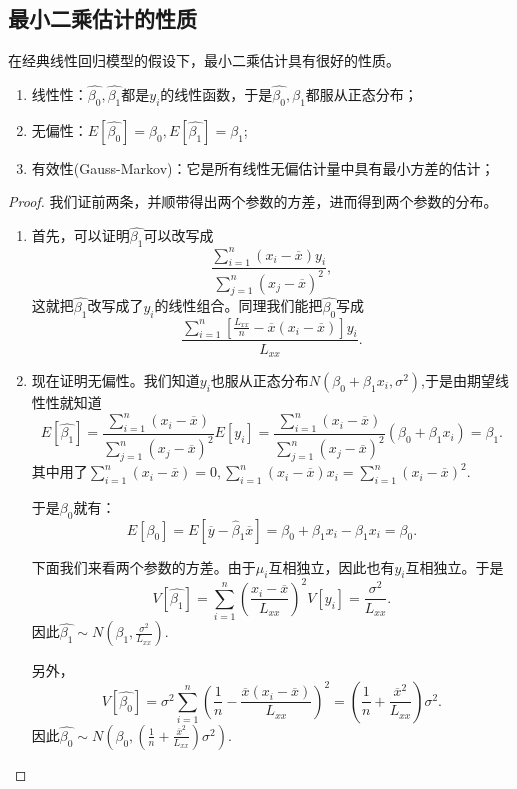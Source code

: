 \documentclass[lang=cn,10pt]{elegantbook}
\begin{document}
    \subsection{最小二乘估计的性质}
    在经典线性回归模型的假设下，最小二乘估计具有很好的性质。
    \begin{property}
        \begin{enumerate}
            \item 线性性：\(\hat{\beta_0},\hat{\beta_1}\)都是\(y_i\)的线性函数，于是\(\hat{\beta_0},\hat{\beta_1}\)都服从正态分布；
            \item 无偏性：\(E[\hat{\beta_0}]=\beta_0,E[\hat{\beta_1}]=\beta_1\);
            \item 有效性(Gauss-Markov)：它是所有线性无偏估计量中具有最小方差的估计；
        \end{enumerate}
    \end{property}
    \begin{proof}
        我们证前两条，并顺带得出两个参数的方差，进而得到两个参数的分布。
        \begin{enumerate}
            \item 首先，可以证明\(\hat{\beta_1}\)可以改写成\[\frac{\sum_{i=1}^n(x_i-\overline{x})y_i}{\sum_{j=1}^{n}(x_j-\overline{x})^2},\]这就把\(\hat{\beta_1}\)改写成了\(y_i\)的线性组合。同理我们能把\(\hat{\beta_0}\)写成\[\frac{\sum_{i=1}^n[\frac{L_{xx}}{n}-\overline{x}(x_i-\overline{x})]y_i}{L_{xx}}.\]
            \item 现在证明无偏性。我们知道\(y_i\)也服从正态分布\(N(\beta_0+\beta_1x_i,\sigma^2)\),于是由期望线性性就知道\[E[\hat{\beta_1}]=\frac{\sum_{i=1}^n(x_i-\overline{x})}{\sum_{j=1}^{n}(x_j-\overline{x})^2}E[y_i]=\frac{\sum_{i=1}^n(x_i-\overline{x})}{\sum_{j=1}^{n}(x_j-\overline{x})^2}(\beta_0+\beta_1x_i)=\beta_1.\]其中用了\(\sum_{i=1}^n(x_i-\overline{x})=0,\sum_{i=1}^n(x_i-\overline{x})x_i=\sum_{i=1}^n(x_i-\overline{x})^2.\)
            
            于是\(\beta_0\)就有：\[E[\beta_0]=E[\overline{y}-\hat{\beta}_1\overline{x}]=\beta_0+\beta_1x_i-\beta_1 x_i=\beta_0.\]
            
            下面我们来看两个参数的方差。由于\(\mu_i\)互相独立，因此也有\(y_i\)互相独立。于是\[V[\hat{\beta_1}]=\sum_{i=1}^{n}(\frac{x_i-\overline{x}}{L_{xx}})^2V[y_i]=\frac{\sigma^2}{L_{xx}}.\]
            因此\(\hat{\beta_1}\sim N(\beta_1,\frac{\sigma^2}{L_{xx}})\).

            另外，\[V[\hat{\beta_0}]=\sigma^2\sum_{i=1}^{n}(\frac{1}{n}-\frac{\overline{x}(x_i-\overline{x})}{L_{xx}})^2=(\frac{1}{n}+\frac{\overline{x}^2}{L_{xx}})\sigma^2.\]
            因此\(\hat{\beta_0}\sim N(\beta_0,(\frac{1}{n}+\frac{\overline{x}^2}{L_{xx}})\sigma^2)\).
        \end{enumerate}
    \end{proof}
\end{document}
